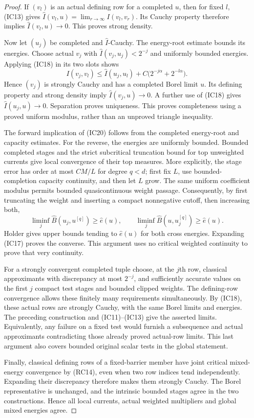 \begin{proof}
If $(v_l)$ is an actual defining row for a completed $u$, then
for fixed $l$, (IC13) gives
$\widehat I(v_l,u)=\lim_{r\to\infty}I(v_l,v_r)$.
Its Cauchy property therefore implies
$\widehat I(v_l,u)\to0$. This proves strong density.

Now let $(u_j)$ be completed and $\widehat I$-Cauchy.
The energy-root estimate bounds its energies. Choose actual
$v_j$ with $\widehat I(v_j,u_j)<2^{-j}$ and uniformly bounded
energies. Applying (IC18) in its two slots shows
\[
 I(v_j,v_l)\leq\widehat I(u_j,u_l)
                   +C\bigl(2^{-j\alpha}+2^{-l\alpha}\bigr).
 \tag{IC21}
\]
Hence $(v_j)$ is strongly Cauchy and has a completed Borel
limit $u$. Its defining property and strong density imply
$\widehat I(v_j,u)\to0$. A further use of (IC18) gives
$\widehat I(u_j,u)\to0$. Separation proves uniqueness.
This proves completeness using a proved uniform modulus,
rather than an unproved triangle inequality.

The forward implication of (IC20) follows from the completed
energy-root and capacity estimates. For the reverse, the
energies are uniformly bounded. Bounded completed stages and
the strict subcritical truncation bound for top unweighted
currents give local convergence of their top measures. More
explicitly, the stage error has order at most $C M/L$ for
degree $q<d$; first fix $L$, use bounded-completion capacity
continuity, and then let $L$ grow. The same uniform coefficient
modulus permits bounded quasicontinuous weight passage.
Consequently, by first truncating the weight and inserting a
compact nonnegative cutoff, then increasing both,
\[
 \liminf_j\widehat B(u_j,u^{[q]})\geq\widehat e(u),\qquad
 \liminf_j\widehat B(u,u_j^{[q]})\geq\widehat e(u).
 \tag{IC22}
\]
Holder gives upper bounds tending to $\widehat e(u)$ for
both cross energies. Expanding (IC17) proves the converse.
This argument uses no critical weighted continuity to prove
that very continuity.

For a strongly convergent completed tuple choose, at the $j$th
row, classical approximants with discrepancy at most $2^{-j}$,
and sufficiently accurate values on the first $j$ compact
test stages and bounded clipped weights. The defining-row
convergence allows these finitely many requirements
simultaneously. By (IC18), these actual rows are strongly
Cauchy, with the same Borel limits and energies. The preceding
construction and (IC11)--(IC13) give the asserted limits.
Equivalently, any failure on a fixed test would furnish a
subsequence and actual approximants contradicting those
already proved actual-row limits. This last argument also
covers bounded original scalar tests in the global statement.

Finally, classical defining rows of a fixed-barrier member
have joint critical mixed-energy convergence by (RC14), even
when two row indices tend independently. Expanding their
discrepancy therefore makes them strongly Cauchy. The Borel
representative is unchanged, and the intrinsic bounded stages
agree in the two constructions. Hence all local currents,
actual weighted multipliers and global mixed energies agree.
\end{proof}

